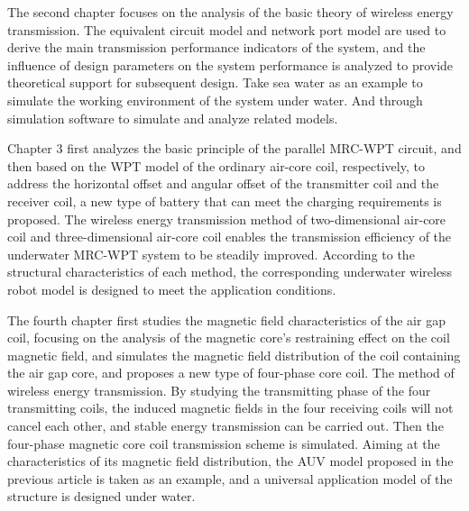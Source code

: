 The second chapter focuses on the analysis of the basic theory of wireless energy transmission. The equivalent circuit model and network port model are used to derive the main transmission performance indicators of the system, and the influence of design parameters on the system performance is analyzed to provide theoretical support for subsequent design. Take sea water as an example to simulate the working environment of the system under water. And through simulation software to simulate and analyze related models.

Chapter 3 first analyzes the basic principle of the parallel MRC-WPT circuit, and then based on the WPT model of the ordinary air-core coil, respectively, to address the horizontal offset and angular offset of the transmitter coil and the receiver coil, a new type of battery that can meet the charging requirements is proposed. The wireless energy transmission method of two-dimensional air-core coil and three-dimensional air-core coil enables the transmission efficiency of the underwater MRC-WPT system to be steadily improved. According to the structural characteristics of each method, the corresponding underwater wireless robot model is designed to meet the application conditions.

The fourth chapter first studies the magnetic field characteristics of the air gap coil, focusing on the analysis of the magnetic core's restraining effect on the coil magnetic field, and simulates the magnetic field distribution of the coil containing the air gap core, and proposes a new type of four-phase core coil. The method of wireless energy transmission. By studying the transmitting phase of the four transmitting coils, the induced magnetic fields in the four receiving coils will not cancel each other, and stable energy transmission can be carried out. Then the four-phase magnetic core coil transmission scheme is simulated. Aiming at the characteristics of its magnetic field distribution, the AUV model proposed in the previous article is taken as an example, and a universal application model of the structure is designed under water.